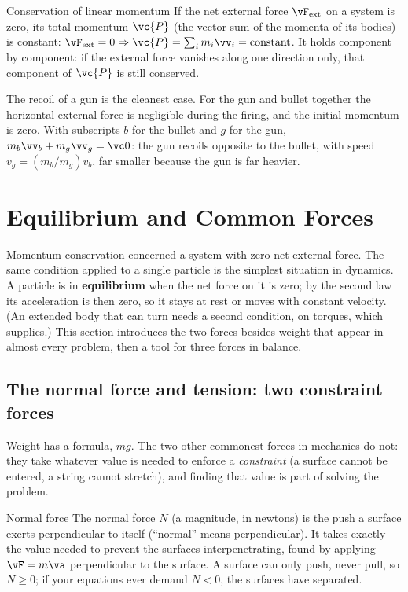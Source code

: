 \begin{keybox}{Conservation of linear momentum}
If the net external force $\vF_{\text{ext}}$ on a system is zero, its total momentum $\vc{P}$ (the vector
sum of the momenta of its bodies) is constant:
$\vF_{\text{ext}}=0\Rightarrow\vc{P}=\sum_i m_i\vv_i=\text{constant}$. It holds component by component:
if the external force vanishes along one direction only, that component of $\vc{P}$ is still conserved.
\end{keybox}

The recoil of a gun is the cleanest case. For the gun and bullet together the horizontal external
force is negligible during the firing, and the initial momentum is zero. With subscripts $b$ for the
bullet and $g$ for the gun, $m_b\vv_b+m_g\vv_g=\vc0$: the
gun recoils opposite to the bullet, with speed $v_g=(m_b/m_g)v_b$, far smaller because the gun is far heavier.

\section{Equilibrium and Common Forces}

Momentum conservation concerned a system with zero net external force. The same condition applied to a
single particle is the simplest situation in dynamics. A particle is in \textbf{equilibrium} when the
net force on it is zero; by the second law its acceleration is then zero, so it stays at rest or moves
with constant velocity. (An extended body that can turn needs a second condition, on torques, which
 supplies.) This section introduces the two forces besides weight that appear in
almost every problem, then a tool for three forces in balance.

\subsection{The normal force and tension: two constraint forces}

Weight has a formula, $mg$. The two other commonest forces in mechanics do not: they take whatever value
is needed to enforce a \emph{constraint} (a surface cannot be entered, a string cannot stretch), and
finding that value is part of solving the problem.

\begin{defbox}{Normal force}
The normal force $N$ (a magnitude, in newtons) is the push a surface exerts perpendicular to itself
(``normal'' means perpendicular). It takes exactly the value needed to prevent the surfaces
interpenetrating, found by applying $\vF=m\va$ perpendicular to the surface. A surface can only push,
never pull, so $N\ge0$; if your equations ever demand $N<0$, the surfaces have separated.
\end{defbox}

